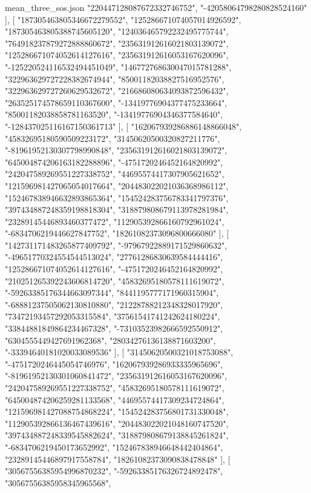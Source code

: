\begin{filecontents*}[overwrite]{mean_three_sos.json}
    "220447128087672332746752",
    "-42058064798280828524160"
   ],
   [
    "187305463805346672279552",
    "125286671074057014926592",
    "187305463805388745605120",
    "124036465792232495775744",
    "764918237879272888860672",
    "235631912616021803139072",
    "125286671074052614127616",
    "235631912616053167620096",
    "-125220524116532494451049",
    "146772768630047015781288",
    "322963629727228382674944",
    "85001182038827516952576",
    "322963629727260629532672",
    "216686080634093872596432",
    "263525174578659110367600",
    "-13419776904377475233664",
    "85001182038858781163520",
    "-13419776904346377584640",
    "-128437025116167150361713"
   ],
   [
    "162067939286886148866048",
    "45832695180590509223172",
    "31450620500320827211776",
    "-81961952130307798990848",
    "235631912616021803139072",
    "645004874206163182288896",
    "-4751720246452164820992",
    "242047589269551227338752",
    "44695574417307905621652",
    "121596981427065054017664",
    "204483022021036368986112",
    "152467838946632893865364",
    "154524283756783341797376",
    "397434887248359198818304",
    "318879808679113978281984",
    "23289145446893460377472",
    "112905392866160792961024",
    "-6834706219446627847752",
    "18261082373096800666080"
   ],
   [
    "142731171483265877409792",
    "-97967922889171529860632",
    "-49651770324554544513024",
    "27761286830639584444416",
    "125286671074052614127616",
    "-4751720246452164820992",
    "210251265392243606814720",
    "45832695180578111619072",
    "-59263385176344663097344",
    "8441195777171960315904",
    "-68881237505062130810880",
    "21228788212348328017920",
    "73472193457292053315584",
    "37561541741242624180224",
    "33844881849864234467328",
    "-73103523982666592550912",
    "6304555449427691962368",
    "28034276136138871603200",
    "-33394640181020033089536"
   ],
   [
    "31450620500321018753088",
    "-4751720246445054746976",
    "162067939286933335965696",
    "-81961952130301060841472",
    "235631912616053167620096",
    "242047589269551227338752",
    "45832695180578111619072",
    "645004874206259281133568",
    "44695574417309234724864",
    "121596981427088754868224",
    "154524283756801731330048",
    "112905392866136467439616",
    "204483022021048160747520",
    "397434887248339545882624",
    "318879808679138845261824",
    "-6834706219450173652992",
    "152467838946648442404864",
    "23289145446897917558784",
    "18261082373090838478848"
   ],
   [
    "30567556385954996870232",
    "-59263385176326724892478",
    "30567556385958345965568",

\end{filecontents*}
